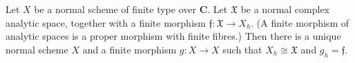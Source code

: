 Let $X$ be a normal scheme of finite type over $\mathbf{C}$. Let $\mathfrak{X}$ be a normal complex analytic space, together with a finite morphism $\mathfrak{f}: \mathfrak{X} \rightarrow X_h$. (A finite morphism of analytic spaces is a proper morphism with finite fibres.) Then there is a unique normal scheme $X$ and a finite morphism $g: X \rightarrow X$ such that $X_h \cong \mathfrak{X}$ and $g_h = \mathfrak{f}$.
